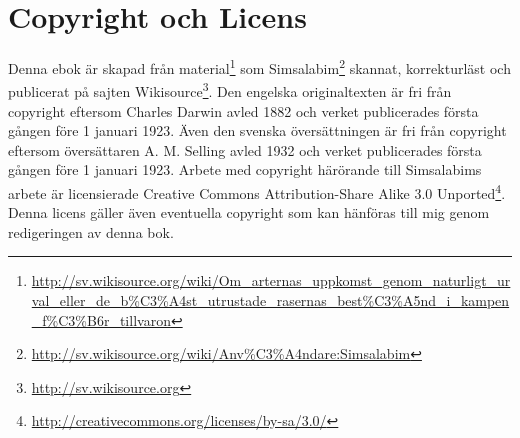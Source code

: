 \chapter{Copyright och Licens}
Denna ebok är skapad från
material\footnote{\url{http://sv.wikisource.org/wiki/Om_arternas_uppkomst_genom_naturligt_urval_eller_de_b\%C3\%A4st_utrustade_rasernas_best\%C3\%A5nd_i_kampen_f\%C3\%B6r_tillvaron}}
som
Simsalabim\footnote{\url{http://sv.wikisource.org/wiki/Anv\%C3\%A4ndare:Simsalabim}}
skannat, korrekturläst och publicerat på sajten
Wikisource\footnote{\url{http://sv.wikisource.org}}. Den engelska
originaltexten är fri från copyright eftersom Charles Darwin avled 1882 och
verket publicerades första gången före 1 januari 1923. Även den svenska
översättningen är fri från copyright eftersom översättaren A. M. Selling avled
1932 och verket publicerades första gången före 1 januari 1923. Arbete med
copyright härörande till Simsalabims arbete är licensierade Creative Commons
Attribution-Share Alike 3.0
Unported\footnote{\url{http://creativecommons.org/licenses/by-sa/3.0/}}. Denna
licens gäller även eventuella copyright som kan hänföras till mig genom
redigeringen av denna bok.

